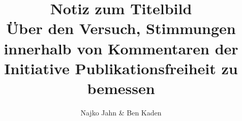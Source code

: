 

\fancyhead[R]{\thepage} %

\title{\LARGE{Notiz zum Titelbild\\Über den Versuch, Stimmungen innerhalb von Kommentaren der Initiative Publikationsfreiheit zu bemessen}} %
\author{Najko Jahn \& Ben Kaden} %

\setcounter{page}{1}
